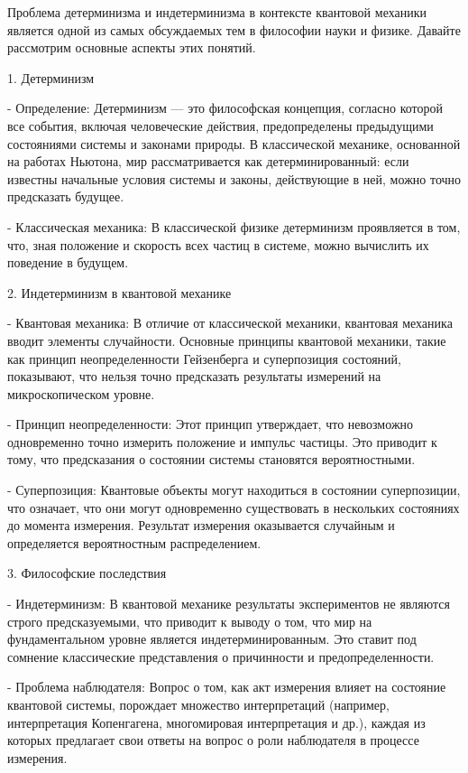 \documentclass[exam_answers.tex]{subfiles}
\begin{document}
\renewcommand{\baselinestretch}{\blch}

Проблема детерминизма и индетерминизма в контексте квантовой механики является одной из самых обсуждаемых тем в философии науки и физике. Давайте рассмотрим основные аспекты этих понятий.

1. Детерминизм

- Определение: Детерминизм — это философская концепция, согласно которой все события, включая человеческие действия, предопределены предыдущими состояниями системы и законами природы. В классической механике, основанной на работах Ньютона, мир рассматривается как детерминированный: если известны начальные условия системы и законы, действующие в ней, можно точно предсказать будущее.

- Классическая механика: В классической физике детерминизм проявляется в том, что, зная положение и скорость всех частиц в системе, можно вычислить их поведение в будущем.

2. Индетерминизм в квантовой механике

- Квантовая механика: В отличие от классической механики, квантовая механика вводит элементы случайности. Основные принципы квантовой механики, такие как принцип неопределенности Гейзенберга и суперпозиция состояний, показывают, что нельзя точно предсказать результаты измерений на микроскопическом уровне.

- Принцип неопределенности: Этот принцип утверждает, что невозможно одновременно точно измерить положение и импульс частицы. Это приводит к тому, что предсказания о состоянии системы становятся вероятностными.

- Суперпозиция: Квантовые объекты могут находиться в состоянии суперпозиции, что означает, что они могут одновременно существовать в нескольких состояниях до момента измерения. Результат измерения оказывается случайным и определяется вероятностным распределением.

3. Философские последствия

- Индетерминизм: В квантовой механике результаты экспериментов не являются строго предсказуемыми, что приводит к выводу о том, что мир на фундаментальном уровне является индетерминированным. Это ставит под сомнение классические представления о причинности и предопределенности.

- Проблема наблюдателя: Вопрос о том, как акт измерения влияет на состояние квантовой системы, порождает множество интерпретаций (например, интерпретация Копенгагена, многомировая интерпретация и др.), каждая из которых предлагает свои ответы на вопрос о роли наблюдателя в процессе измерения.
\end{document}
